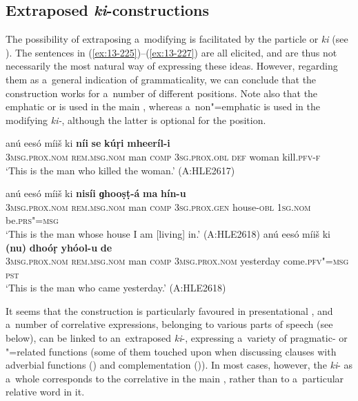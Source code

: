 \subsection{Extraposed \textit{ki}-constructions}
\label{subsec:13-6-7}

The possibility of extraposing a~modifying  is facilitated by the particle or  \textit{ki} (see ). The sentences in (\ref{ex:13-225})--(\ref{ex:13-227}) are all elicited, and are thus not necessarily the most natural way of expressing these ideas. However, regarding them as a~general indication of grammaticality, we can conclude that the construction works for a~number of different positions. Note also that the emphatic or   is used in the main , whereas a~non"=emphatic   is used in the modifying \textit{ki-}, although the latter is optional for the  position.

\ea
\label{ex:13-225}
\gll anú eesó míiš ki \textbf{níi} \textbf{se} \textbf{kúṛi} \textbf{mheeríl-i}\\
\textsc{3msg.prox.nom} \textsc{rem.msg.nom} man \textsc{comp} \textsc{3sg.prox.obl} \textsc{def} woman kill.\textsc{pfv-f}\\
\glt `This is the man who killed the woman.' (A:HLE2617)

\ex
\label{ex:13-226}
\gll anú eesó míiš ki \textbf{nisíi} \textbf{ɡhooṣṭ-á} \textbf{ma} \textbf{hín-u}\\
\textsc{3msg.prox.nom} \textsc{rem.msg.nom} man \textsc{comp} \textsc{3sg.prox.gen} house-\textsc{obl} \textsc{1sg.nom} be.\textsc{prs"=msg}\\
\glt `This is the man whose house I am [living] in.' (A:HLE2618) 
\ex
\label{ex:13-227}
\gll anú eesó míiš ki \textbf{(nu)} \textbf{dhoóṛ} \textbf{yhóol-u} \textbf{de}\\
\textsc{3msg.prox.nom} \textsc{rem.msg.nom} man \textsc{comp} \textsc{3msg.prox.nom} yesterday come.\textsc{pfv"=msg} \textsc{pst}\\
\glt `This is the man who came yesterday.' (A:HLE2618) 
\z

It seems that the construction is particularly favoured in presentational , and a~number of correlative expressions, belonging to various parts of speech (see below), can be linked to an~extraposed \textit{ki}-, expressing a~variety of pragmatic- or "=related functions (some of them touched upon when discussing clauses with adverbial functions () and complementation ()). In most cases, however, the \textit{ki}- as a~whole corresponds to the correlative in the main , rather than to a~particular relative word in it.

